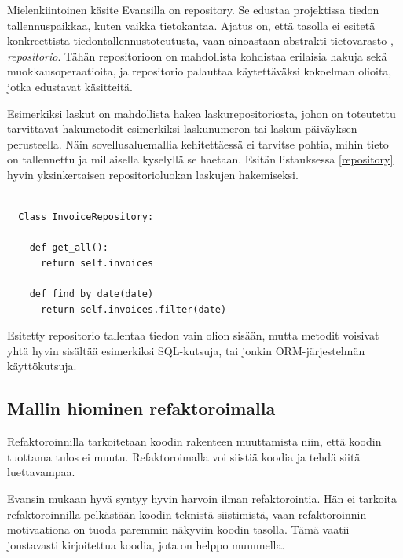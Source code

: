 Mielenkiintoinen käsite Evansilla on \gls{repository}. Se edustaa
projektissa tiedon tallennuspaikkaa, kuten vaikka tietokantaa. Ajatus
on, että  tasolla ei esitetä
konkreettista tiedontallennustoteutusta, vaan ainoastaan abstrakti
tietovarasto , \emph{repositorio}. Tähän repositorioon on mahdollista
kohdistaa erilaisia hakuja sekä muokkausoperaatioita, ja repositorio
palauttaa käytettäväksi kokoelman olioita, jotka edustavat
 käsitteitä.

Esimerkiksi laskut on mahdollista hakea laskurepositoriosta, johon on
toteutettu tarvittavat hakumetodit esimerkiksi laskunumeron tai laskun
päiväyksen perusteella. Näin sovellusaluemallia kehitettäessä ei
tarvitse pohtia, mihin tieto on tallennettu ja millaisella kyselyllä se
haetaan. Esitän listauksessa \ref{repository} hyvin yksinkertaisen
repositorioluokan laskujen hakemiseksi.

\begin{code}
  \begin{verbatim}
  
  Class InvoiceRepository:
  
    def get_all():
      return self.invoices
      
    def find_by_date(date)
      return self.invoices.filter(date)

\end{verbatim}
  \label{repository}
\end{code}

Esitetty repositorio tallentaa tiedon vain olion sisään, mutta metodit
voisivat yhtä hyvin sisältää esimerkiksi SQL-kutsuja, tai jonkin
ORM-järjestelmän käyttökutsuja.

\hypertarget{mallin-hiominen-refaktoroimalla}{%
\subsection{Mallin hiominen
refaktoroimalla}\label{mallin-hiominen-refaktoroimalla}}

Refaktoroinnilla tarkoitetaan koodin rakenteen muuttamista niin, että
koodin tuottama tulos ei muutu. Refaktoroimalla voi siistiä koodia ja
tehdä siitä luettavampaa.

Evansin mukaan hyvä  syntyy hyvin harvoin
ilman refaktorointia. Hän ei tarkoita refaktoroinnilla pelkästään koodin
teknistä siistimistä, vaan refaktoroinnin motivaationa on tuoda
 paremmin näkyviin koodin tasolla. Tämä vaatii
joustavasti kirjoitettua koodia, jota on helppo
muunnella.\cite[osa 3.]{evans:ddd}

